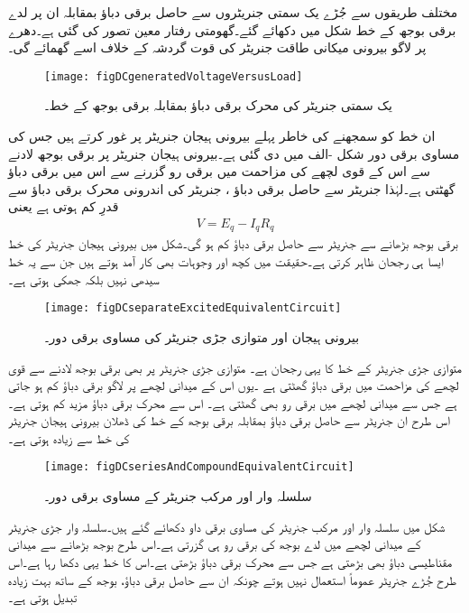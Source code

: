 مختلف طریقوں سے جُڑے یک سمتی جنریٹروں سے حاصل برقی دباؤ بمقابلہ ان پر لدے برقی بوجھ کے خط شکل   میں دکھائے گئے۔گھومتی رفتار معین تصور کی گئی ہے۔دھرے پر لاگو بیرونی میکانی طاقت جنریٹر کی قوت گردشہ کے خلاف اسے گھمائے گی۔
\begin{figure}
\centering
\texttt{[image: figDCgeneratedVoltageVersusLoad]}
\caption{یک سمتی جنریٹر کی محرک برقی دباؤ بمقابلہ برقی بوجھ کے خط۔}
\label{شکل_یکسمتی_محرک_دباؤ_بالمقابل_بار}
\end{figure}

ان خط کو سمجھنے کی خاطر پہلے بیرونی ہیجان جنریٹر پر غور کرتے ہیں جس کی مساوی برقی دور شکل -الف میں دی گئی ہے۔بیرونی ہیجان جنریٹر پر برقی بوجھ لادنے سے اس کے قوی لچھے کی مزاحمت  میں برقی رو   گزرنے سے اس میں برقی دباؤ گھٹتی ہے۔لہٰذا جنریٹر سے حاصل برقی دباؤ ، جنریٹر کی اندرونی محرک برقی دباؤ   سے قدرِ کم ہوتی ہے یعنی
\begin{align}
V=E_q-I_q R_q
\end{align}
برقی بوجھ  بڑھانے سے جنریٹر سے حاصل برقی دباؤ کم ہو گی۔شکل میں بیرونی ہیجان جنریٹر کی خط ایسا ہی رجحان ظاہر کرتی ہے۔حقیقت میں کچھ اور وجوہات بھی کار آمد ہوتے ہیں جن سے یہ خط سیدھی نہیں بلکہ جھکی ہوتی ہے۔ 
\begin{figure}
\centering
\texttt{[image: figDCseparateExcitedEquivalentCircuit]}
\caption{بیرونی ہیجان اور متوازی جڑی جنریٹر کی مساوی برقی دور۔}
\label{شکل_یکسمتی_خارجی_ہیجان_کا_مساوی}
\end{figure}

متوازی جڑی جنریٹر کے خط کا یہی رجحان ہے۔ متوازی جڑی جنریٹر پر بھی برقی بوجھ لادنے سے قوی لچھے کی مزاحمت میں برقی دباؤ گھٹتی ہے ۔یوں اس کے میدانی لچھے پر لاگو برقی دباؤ کم ہو جاتی ہے جس سے میدانی لچھے میں برقی رو بھی گھٹتی ہے۔ اس سے محرک برقی دباؤ مزید کم ہوتی ہے۔اس طرح ان جنریٹر سے حاصل برقی دباؤ بمقابلہ برقی بوجھ کے خط کی ڈھلان بیرونی ہیجان جنریٹر کی خط سے زیادہ ہوتی ہے۔
\begin{figure}
\centering
\texttt{[image: figDCseriesAndCompoundEquivalentCircuit]}
\caption{سلسلہ وار اور مرکب جنریٹر کے مساوی برقی دور۔}
\label{شکل_یکسمتی_سلسلہ_وار_اور_مرکب_مساوی}
\end{figure}

شکل   میں سلسلہ وار اور مرکب جنریٹر کی مساوی برقی داو دکھائے گئے ہیں۔سلسلہ وار جڑی جنریٹر کے میدانی لچھے میں لدے  بوجھ کی برقی رو ہی گزرتی ہے۔اس طرح بوجھ بڑھانے سے میدانی مقناطیسی دباؤ بھی بڑھتی ہے جس سے محرک برقی دباؤ بڑھتی ہے۔اس کا خط یہی دکھا رہا ہے۔اس طرح جُڑے جنریٹر عموماً استعمال نہیں ہوتے چونکہ ان سے حاصل برقی دباؤ، بوجھ کے ساتھ بہت زیادہ تبدیل ہوتی ہے۔ 

